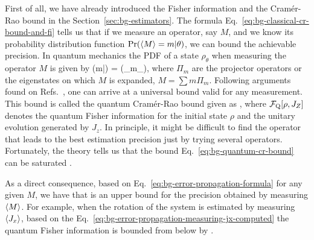 First of all, we have already introduced the Fisher information and the Cram\'er-Rao bound in the Section~\ref{sec:bg-estimators}.
The formula Eq.~\eqref{eq:bg-classical-cr-bound-and-fi} tells us that if we measure an operator, say $M$, and we know its probability distribution function $\text{Pr}(\langle{M}\rangle=m|\theta)$, we can bound the achievable precision.
In quantum mechanics the PDF of a state $\rho_\theta$ when measuring the operator $M$ is given by
\be
  \prob(m|\theta) = \tr({\Pi_{m}\rho_\theta}),
\ee
where $\Pi_{m}$ are the projector operators or the eigenstates on which $M$ is expanded, $M = \sum m \Pi_m$.
Following arguments found on Refs.~\cite{Giovannetti2004, Paris2009}, one can arrive at a universal bound valid for any measurement.
This bound is called the quantum Cram\'er-Rao bound given as
\be
  \label{eq:bg-quantum-cr-bound}
  \varinv{\theta} \leqslant {},
\ee
where $\mathcal{F}_{\textnormal{Q}}[{\textstyle \rho, J_Z}]$ denotes the quantum Fisher information for the initial state $\rho$ and the unitary evolution generated by $J_z$.
In principle, it might be difficult to find the operator that leads to the best estimation precision just by trying several operators.
Fortunately, the theory tells us that the bound Eq.~\eqref{eq:bg-quantum-cr-bound} can be saturated \cite{Helstrom1976, Holevo1982}.

As a direct consequence, based on Eq.~\eqref{eq:bg-error-propagation-formula} for any given $M$, we have that
\be
   \geqslant {}
\ee
is an upper bound for the precision obtained by measuring $\langle{M}\rangle$.
For example, when the rotation of the system is estimated by measuring $\langle{J_x}\rangle$, based on the Eq.~\eqref{eq:bg-error-propagation-measuring-jx-computed} the quantum Fisher information is bounded from below by \cite{Pezze2009}
\be
  \label{eq:bg-pezze-bound}
   \geqslant {}.
\ee

